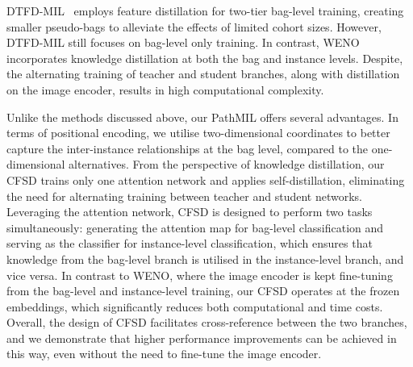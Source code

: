 DTFD-MIL~\cite{zhang2022dtfd} employs feature distillation for two-tier bag-level training, creating smaller pseudo-bags to alleviate the effects of limited cohort sizes. However, DTFD-MIL still focuses on bag-level only training. In contrast, WENO~\cite{qu2022bidirectional} incorporates knowledge distillation at both the bag and instance levels. Despite, the alternating training of teacher and student branches, along with distillation on the image encoder, results in high computational complexity.

Unlike the methods discussed above, our PathMIL offers several advantages. In terms of positional encoding, we utilise two-dimensional coordinates to better capture the inter-instance relationships at the bag level, compared to the one-dimensional alternatives. From the perspective of knowledge distillation, our CFSD trains only one attention network and applies self-distillation, eliminating the need for alternating training between teacher and student networks. Leveraging the attention network, CFSD is designed to perform two tasks simultaneously: generating the attention map for bag-level classification and serving as the classifier for instance-level classification, which ensures that knowledge from the bag-level branch is utilised in the instance-level branch, and vice versa. In contrast to WENO, where the image encoder is kept fine-tuning from the bag-level and instance-level training, our CFSD operates at the frozen embeddings, which significantly reduces both computational and time costs. Overall, the design of CFSD facilitates cross-reference between the two branches, and we demonstrate that higher performance improvements can be achieved in this way, even without the need to fine-tune the image encoder.


